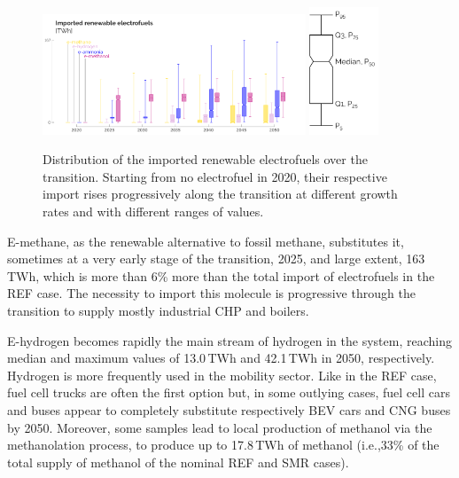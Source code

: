 \documentclass[11pt,twoside,a4paper,english]{article}
\def\ie{i.e.,}
\begin{document}
\begin{figure}[htbp!]
\centering
\includegraphics[width=0.7\textwidth]{UQ_Electrofuels_no_outlier.pdf}
\includegraphics[height=3.8cm]{Schematic_boxplot_no_outlier.pdf}
\caption{Distribution of the imported renewable electrofuels over the transition. Starting from no electrofuel in 2020, their respective import rises progressively along the transition at different growth rates and with different ranges of values. }
\label{fig:results_uq_electrofuels}
\end{figure}

E-methane, as the renewable alternative to fossil methane, substitutes it, sometimes at a very early stage of the transition, 2025, and large extent, 163\,TWh, which is more than 6\% more than the total import of electrofuels in the REF case. The necessity to import this molecule is progressive through the transition to supply mostly industrial \gls{CHP} and boilers. 

E-hydrogen becomes rapidly the main stream of hydrogen in the system, reaching median and maximum values of 13.0\,TWh and 42.1\,TWh in 2050, respectively. Hydrogen is more frequently used in the mobility sector. Like in the REF case, fuel cell trucks are often the first option but, in some outlying cases, fuel cell cars and buses appear to completely substitute respectively \gls{BEV} cars and \gls{CNG} buses by 2050. Moreover, some samples lead to local production of methanol via the methanolation process, to produce up to 17.8\,TWh of methanol (\ie 33\% of the total supply of methanol of the nominal REF and SMR cases). 
\end{document}
